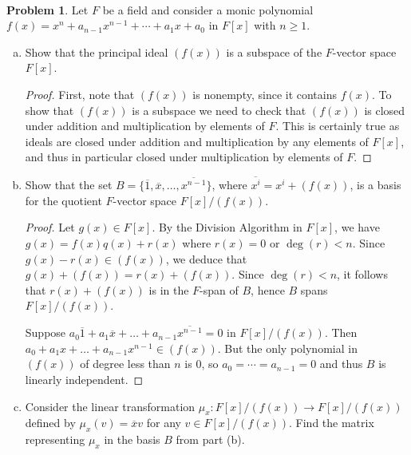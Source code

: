 \documentclass[11pt]{article}
\newcommand{\ov}[1]{\overline{#1}}
\def\ov#1{\overline{#1}}
\theoremstyle{definition}
\newtheorem{problem}{Problem}
\begin{document}
\



\begin{problem}
Let $F$ be a field and consider a monic polynomial $f(x)=x^n+a_{n-1}x^{n-1}+\cdots+a_1x+a_0$ in $F[x]$ with $n \geqslant 1$.
\begin{enumerate}[(a)]
\item Show that the principal ideal $(f(x))$ is a subspace of the $F$-vector space $F[x]$.

\begin{proof}
First, note that $(f(x))$ is nonempty, since it contains $f(x)$.
To show that $(f(x))$ is a subspace we need to check that $(f(x))$ is closed under addition and multiplication by elements of $F$. This is certainly true as ideals are closed under addition and multiplication by any elements of $F[x]$, and thus in particular closed under multiplication by elements of $F$.
\end{proof}

\item Show that  the set $B=\{\ov{1},\ov{x},\ldots,\ov{x^{n-1}}\}$, where $\ov{x^i}=x^i+(f(x))$, is a basis for the quotient $F$-vector space $F[x]/(f(x))$.

\begin{proof}
Let $g(x)\in F[x]$. By the Division Algorithm in $F[x]$, we have $g(x)=f(x)q(x)+r(x)$ where $r(x)=0$ or $\deg(r)<n$. Since $g(x)-r(x)\in(f(x))$, we deduce that $g(x)+(f(x))=r(x)+(f(x))$. Since $\deg(r)<n$, it follows that $r(x)+(f(x))$ is in the $F$-span of $B$, hence $B$ spans $F[x]/(f(x))$.

Suppose $a_0\ov{1}+a_1\ov{x}+\dots+a_{n-1}\ov{x^{n-1}}=0$ in $F[x]/(f(x))$. Then $a_0+a_1x+\dots + a_{n-1}x^{n-1}\in (f(x))$. But the only polynomial in $(f(x))$ of degree less than $n$ is $0$, so $a_0=\cdots =a_{n-1}=0$ and thus $B$ is linearly independent.
\end{proof}

\item Consider the linear transformation $\mu_x : F [x]/(f (x)) \to F[x]/(f(x))$ defined by $\mu_x(v)=\ov{x}v$ for any $v\in F [x]/(f (x))$. Find the matrix representing $\mu_x$ in the basis $B$ from part (b).


\end{enumerate}
\end{problem}
\end{document}
